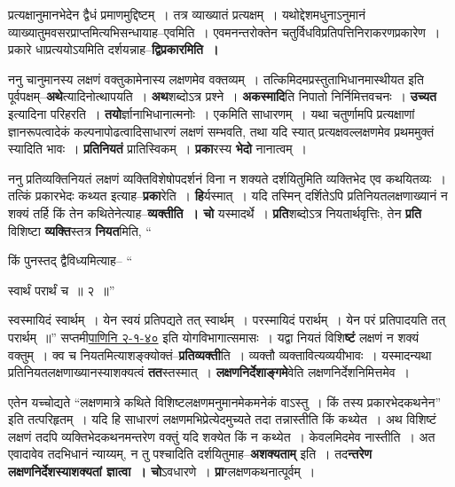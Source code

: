 \documentclass[article,12pt,a4paper]{memoir}
\begin{document}
	  \endgroup
	

	  \pstart प्रत्यक्षानुमानभेदेन द्वैधं प्रमाणमुद्दिष्टम् । तत्र व्याख्यातं प्रत्यक्षम् । यथोद्देशमधुनाऽनुमानं व्याख्यातुमवसरप्राप्तमित्यभिसन्धायाह--एवमिति । एवमनन्तरोक्तेन चतुर्विधविप्रतिपत्तिनिराकरणप्रकारेण । प्रकारे धाप्रत्ययोऽयमिति दर्शयन्नाह--\textbf{द्विप्रकारमिति ।}
	\pend
      

	  \pstart ननु चानुमानस्य लक्षणं वक्तुकामेनास्य लक्षणमेव वक्तव्यम् । तत्किमिदमप्रस्तुताभिधानमास्थीयत इति पूर्वपक्षम्--\textbf{अथे}त्यादिनोत्थापयति । \textbf{अथ}शब्दोऽत्र प्रश्ने । \textbf{अकस्मादि}ति निपातो निर्निमित्तवचनः । \textbf{उच्यत} इत्यादिना परिहरति । \textbf{तयो}र्ज्ञानाभिधानात्मनोः । एकमिति साधारणम् । यथा चतुर्णामपि प्रत्यक्षाणां ज्ञानरूपत्वादेकं कल्पनापोढत्वादिसाधारणं लक्षणं सम्भवति, तथा यदि स्यात् प्रत्यक्षवल्लक्षणमेव प्रथममुक्तं स्यादिति भावः । \textbf{प्रतिनियतं} प्रातिस्विकम् । \textbf{प्रका}रस्य \textbf{भेदो} नानात्वम् ।
	\pend
      

	  \pstart ननु प्रतिव्यक्तिनियतं लक्षणं व्यक्तिविशेषोपदर्शनं विना न शक्यते दर्शयितुमिति व्यक्तिभेद एव कथयितव्यः । तत्किं प्रकारभेदः कथ्यत इत्याह--\textbf{प्रका}रेति । \textbf{हि}र्यस्मात् । यदि तस्मिन् दर्शितेऽपि प्रतिनियतलक्षणाख्यानं न शक्यं तर्हि किं तेन कथितेनेत्याह--\textbf{व्यक्तीति । चो} यस्मादर्थे । \textbf{प्रति}शब्दोऽत्र नियतार्थवृत्तिः, तेन \textbf{प्रति} विशिष्टा \textbf{व्यक्ति}स्तत्र \textbf{नियत}मिति,  \leavevmode{} “
	  
	किं पुनस्तद् द्वैविध्यमित्याह-- “
	  
	स्वार्थं परार्थं च ॥ २ ॥” 
	  
	स्वस्मायिदं स्वार्थम् । येन स्वयं प्रतिपद्यते तत् स्वार्थम् । परस्मायिदं परार्थम् । येन परं प्रतिपादयति तत् परार्थम् ॥” सप्तमी\href{http://http://sarit.indology.info/?cref=Pā.2.1.40}{पाणिनि २-१-४०} इति योगविभागात्समासः । यद्वा नियतं विशि\textbf{ष्टं} लक्षणं न शक्यं वक्तुम् । क्व च नियतमित्याशङ्क्योक्तं--\textbf{प्रतिव्यक्ती}ति । व्यक्तौ व्यक्तावित्यव्ययीभावः । यस्मादन्यथा प्रतिनियतलक्षणाख्यानस्याशक्यत्वं \textbf{तत}स्तस्मात् । \textbf{लक्षणनिर्देशाङ्गमे}वेति लक्षणनिर्देशनिमित्तमेव ।
	\pend
      

	  \pstart एतेन यच्चोद्यते “लक्षणमात्रे कथिते विशिष्टलक्षणमनुमानमेकमनेकं वाऽस्तु । किं तस्य प्रकारभेदकथनेन” इति तत्परिहृतम् । यदि हि साधारणं लक्षणमभिप्रेत्येदमुच्यते तदा तन्नास्तीति किं कथ्येत । अथ विशिष्टं लक्षणं तदपि व्यक्तिभेदकथनमन्तरेण वक्तुं यदि शक्येत किं न कथ्येत । केवलमिदमेव नास्तीति । अत एवादावेव तदभिधानं न्याय्यम्, न तु पश्चादिति दर्शयितुमाह--\textbf{अशक्यताम्} इति । तद\textbf{न्तरेण लक्षणनिर्देशस्याशक्यतां ज्ञात्वा । चो}ऽवधारणे । \textbf{प्रा}ग्लक्षणकथनात्पूर्वम् ।
	\pend
      
\end{document}
